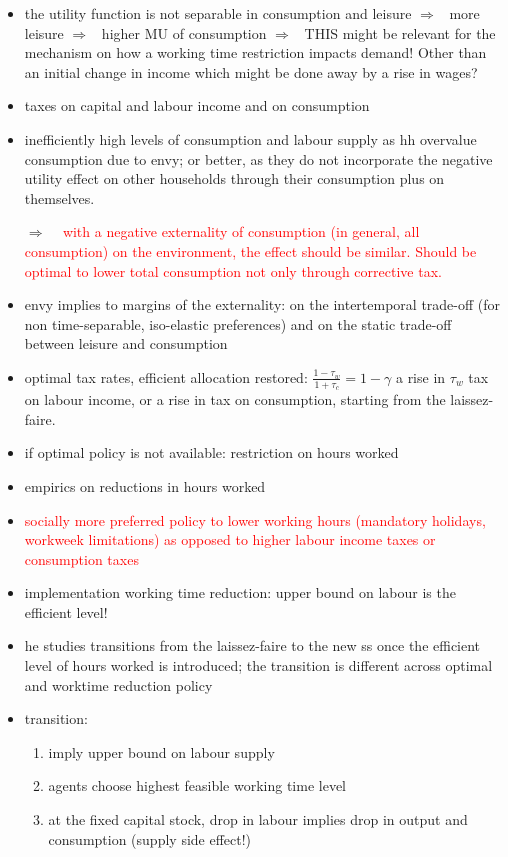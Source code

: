 \documentclass[12pt]{article}
\newcommand{\ar}{$\Rightarrow$ \ }
\newcommand{\tr}[1]{\textcolor{red}{#1}}
\begin{document}
\begin{itemize}
\begin{itemize}
\item the utility function is not separable in consumption and leisure \ar more leisure \ar higher MU of consumption \ar THIS might be relevant for the mechanism on how a working time restriction impacts demand! Other than an initial change in income which might be done away by a rise in wages?
\item taxes on capital and labour income and on consumption
\item inefficiently high levels of consumption and labour supply as hh overvalue consumption due to envy; or better, as they do not incorporate the negative utility effect on other households through their consumption plus on themselves. 
\item[\ar] \tr{with a negative externality of consumption (in general, all consumption) on the environment, the effect should be similar. Should be optimal to lower total consumption not only through corrective tax. }
\item envy implies to margins of the externality: on the intertemporal trade-off (for non time-separable, iso-elastic preferences) and on the static trade-off between leisure and consumption
\item optimal tax rates, efficient allocation restored: $\frac{1-\tau_w}{1+\tau_c}=1-\gamma$ a rise in $\tau_w$ tax on labour income, or a rise in tax on consumption, starting from the laissez-faire. 
\item if optimal policy is not available: restriction on hours worked
\item empirics on reductions in hours worked
\item \tr{socially more preferred policy to lower working hours (mandatory holidays, workweek limitations) as opposed to higher labour income taxes or consumption taxes}
\item implementation working time reduction: upper bound on labour is the efficient level! 
\item he studies transitions from the laissez-faire to the new ss once the efficient level of hours worked is introduced; the transition is different across optimal and worktime reduction policy
\item transition:
\begin{enumerate}
\item imply upper bound on labour supply
\item agents choose highest feasible working time level
\item at the fixed capital stock, drop in labour implies drop in output and consumption (supply side effect!)

\end{enumerate}
\end{itemize}
\end{itemize}
\end{document}
